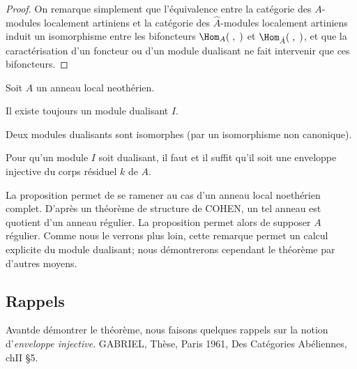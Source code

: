 \begin{proof}
On remarque simplement que l'\'equivalence entre la cat\'egorie des $A$-modules localement artiniens et la cat\'egorie des $\hat{A}$-modules localement artiniens induit un isomorphisme entre les bifoncteurs $\Hom_{A}(\;, \;)$ et $\Hom_{\hat{A}}(\;, \;)$, et que la caract\'erisation d'un foncteur ou d'un module dualisant ne fait intervenir que ces bifoncteurs.
\skipqed
\end{proof}

\begin{theoreme} \label{IV.4.7}
Soit $A$ un anneau local neoth\'erien.
\begin{enumeratea}
\item
Il existe toujours un module dualisant $I$.

\item
Deux modules dualisants sont isomorphes (par un isomorphisme non canonique).

\item
Pour qu'un module $I$ soit dualisant, il faut et il suffit qu'il soit une enveloppe injective du corps r\'esiduel $k$ de $A$.
\end{enumeratea}
\end{theoreme}

\begin{remarque} \label{IV.4.8}
La proposition  permet de se ramener au cas d'un anneau local noeth\'erien complet. D'apr\`es un th\'eor\`eme de structure de COHEN, un tel anneau est quotient d'un anneau r\'egulier. La proposition  permet alors de supposer $A$ r\'egulier. Comme nous le verrons plus loin, cette remarque permet un calcul explicite du module dualisant; nous d\'emontrerons cependant le th\'eor\`eme  par d'autres moyens.
\end{remarque}

\subsection*{Rappels}
Avant\pageoriginale de d\'emontrer le th\'eor\`eme, nous faisons quelques rappels sur la notion d'\emph{enveloppe injective}. \Cf GABRIEL, Th\`ese, Paris 1961, Des Cat\'egories Ab\'eliennes, ch\ptbl II \S 5.

